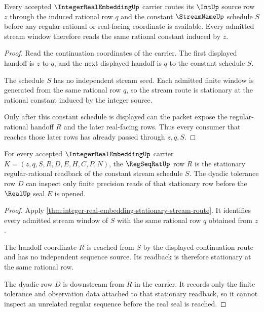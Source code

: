 \begin{theorem}
\label{thm:integer-real-embedding-stationary-stream-route}
Every accepted $\IntegerRealEmbeddingUp$ carrier routes its $\IntUp$ source row $z$ through the induced rational row $q$ and the constant $\StreamNameUp$ schedule $S$ before any regular-rational or real-facing coordinate is available. Every admitted stream window therefore reads the same rational constant induced by $z$.
\end{theorem}
\begin{proof}
Read the continuation coordinates of the carrier. The first displayed handoff is $z$ to $q$, and the next displayed handoff is $q$ to the constant schedule $S$.

The schedule $S$ has no independent stream seed. Each admitted finite window is generated from the same rational row $q$, so the stream route is stationary at the rational constant induced by the integer source.

Only after this constant schedule is displayed can the packet expose the regular-rational handoff $R$ and the later real-facing rows. Thus every consumer that reaches those later rows has already passed through $z,q,S$.
\end{proof}

\begin{theorem}
\label{thm:integer-real-embedding-regseqrat-handoff}
For every accepted $\IntegerRealEmbeddingUp$ carrier $K=(z,q,S,R,D,E,H,C,P,N)$, the $\RegSeqRatUp$ row $R$ is the stationary regular-rational readback of the constant stream schedule $S$. The dyadic tolerance row $D$ can inspect only finite precision reads of that stationary row before the $\RealUp$ seal $E$ is opened.
\end{theorem}
\begin{proof}
Apply \autoref{thm:integer-real-embedding-stationary-stream-route}. It identifies every admitted stream window of $S$ with the same rational row $q$ obtained from $z$.

The handoff coordinate $R$ is reached from $S$ by the displayed continuation route and has no independent sequence source. Its readback is therefore stationary at the same rational row.

The dyadic row $D$ is downstream from $R$ in the carrier. It records only the finite tolerance and observation data attached to that stationary readback, so it cannot inspect an unrelated regular sequence before the real seal is reached.
\end{proof}

